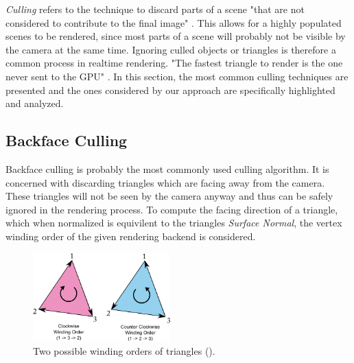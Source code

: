 \emph{Culling} refers to the technique to discard parts of a scene "that are not considered to contribute to the final 
image" \cite{AkenineMoeller2018}. This allows for a highly populated scenes to be rendered, since most parts of a scene 
will probably not be visible by the camera at the same time. Ignoring culled objects or triangles is therefore a common 
process in realtime rendering. "The fastest triangle to render is the one never sent to the \ac{GPU}" \cite{AkenineMoeller2018}.
In this section, the most common culling techniques are presented and the ones considered by our approach are specifically 
highlighted and analyzed. 


\subsection{Backface Culling} \label{subsec-backface-culling}

Backface culling is probably the most commonly used culling algorithm. It is concerned with discarding triangles which are 
facing away from the camera. These triangles will not be seen by the camera anyway and thus can be safely ignored in the 
rendering process. To compute the facing direction of a triangle, which when normalized is equivilent to the triangles 
\emph{Surface Normal}, the vertex winding order of the given rendering backend is considered.\\

\begin{figure}[h]
    \centering
    \includegraphics[width=200px]{images/graphics/winding-order-triangle.png}
    \caption{Two possible winding orders of triangles (\cite{Michel2016}).}
    \label{fig:triangle-winding-order}
\end{figure}

